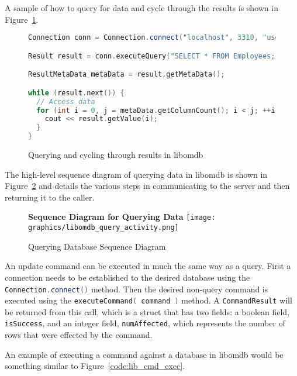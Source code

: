 \documentclass[letterpaper, 11pt]{article}
\newcommand{\inlinecode}[1]{\colorbox{codegrey}{\lstinline[language=C++]{#1}}}
\begin{document}
  A sample of how to query for data and cycle through the results is shown in Figure~\ref{code:lib_query_cycle}.
  \begin{figure}[H]
  \begin{lstlisting}[language=C++]
Connection conn = Connection.connect("localhost", 3310, "users");

Result result = conn.executeQuery("SELECT * FROM Employees;");

ResultMetaData metaData = result.getMetaData();

while (result.next()) {
  // Access data
  for (int i = 0, j = metaData.getColumnCount(); i < j; ++i) {
    cout << result.getValue(i);
  }
}
  \end{lstlisting}
  \label{code:lib_query_cycle}
  \caption{Querying and cycling through results in libomdb}
  \end{figure}
  
  The high-level sequence diagram of querying data in libomdb is shown in Figure~\ref{fig:lib_query_activity}
  and details the various steps in communicating to the server and then returning it to the
  caller.
  \par\vspace{\baselineskip}

  \begin{figure}[H]
    \centering
    \textbf{Sequence Diagram for Querying Data}
    \texttt{[image: graphics/libomdb\_query\_activity.png]}
    \caption{Querying Database Sequence Diagram}
    \label{fig:lib_query_activity}
  \end{figure}

  An update command can be executed in much the same way as a query. First
  a connection needs to be established to the desired database using the
  \inlinecode{Connection.connect()} method. Then the desired non-query
  command is executed using the \inlinecode{executeCommand( command )} method.
  A \inlinecode{CommandResult} will be returned from this call,
  which is a struct that has two fields: a boolean field,
  \inlinecode{isSuccess}, and an integer field,
  \inlinecode{numAffected}, which represents the number of rows
  that were effected by the command.
  \par\vspace{\baselineskip}
  An example of executing a command against a database in libomdb would be something similar
  to Figure~\ref{code:lib_cmd_exec}.
  \par\vspace{\baselineskip}
  
\end{document}
